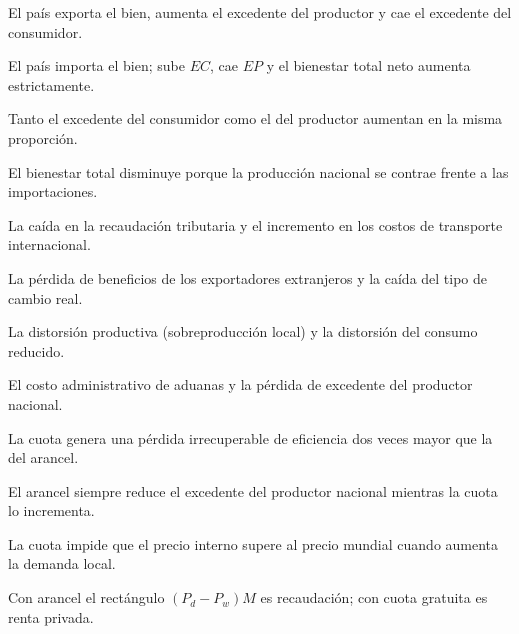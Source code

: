 \begin{opts}
    \item El país exporta el bien, aumenta el excedente del productor y cae el excedente del consumidor.
    \item El país importa el bien; sube $EC$, cae $EP$ y el bienestar total neto aumenta estrictamente.
    \item Tanto el excedente del consumidor como el del productor aumentan en la misma proporción.
    \item El bienestar total disminuye porque la producción nacional se contrae frente a las importaciones.
\end{opts}

\begin{opts}
    \item La caída en la recaudación tributaria y el incremento en los costos de transporte internacional.
    \item La pérdida de beneficios de los exportadores extranjeros y la caída del tipo de cambio real.
    \item La distorsión productiva (sobreproducción local) y la distorsión del consumo reducido.
    \item El costo administrativo de aduanas y la pérdida de excedente del productor nacional.
\end{opts}

\begin{opts}
    \item La cuota genera una pérdida irrecuperable de eficiencia dos veces mayor que la del arancel.
    \item El arancel siempre reduce el excedente del productor nacional mientras la cuota lo incrementa.
    \item La cuota impide que el precio interno supere al precio mundial cuando aumenta la demanda local.
    \item Con arancel el rectángulo $(P_d - P_w)M$ es recaudación; con cuota gratuita es renta privada.
\end{opts}

